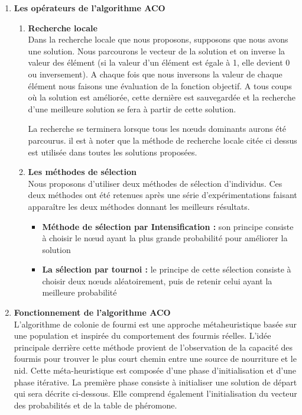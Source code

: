\begin{enumerate}
	\item \textbf{Les opérateurs de l’algorithme ACO}\\
\begin{enumerate}[label=\alph*)]
	\item \textbf{Recherche locale}\\
	Dans la recherche locale que nous proposons, supposons que nous avons une solution. Nous parcourons le vecteur de la solution et on inverse la valeur des élément (si la valeur d’un élément est égale à 1, elle devient 0 ou inversement). A chaque fois que nous inversons  la valeur  de chaque élément nous faisons une évaluation de la fonction objectif. A tous coups où la solution est améliorée, cette dernière est sauvegardée et la recherche d’une meilleure solution se fera à partir de cette solution.
	
La recherche se terminera lorsque tous  les nœuds dominants aurons été parcourus.
il est à noter que la méthode de recherche locale citée ci dessus est utilisée dans toutes les solutions proposées.
	
	\item \textbf{Les méthodes de sélection}\\
	Nous proposons d'utiliser deux méthodes de sélection d’individus. Ces deux méthodes ont été retenues après une série d'expérimentations faisant apparaître les deux méthodes donnant les meilleurs résultats.

	\begin{itemize}
		\item \textbf{Méthode de sélection par Intensification :}
		son principe consiste à choisir le nœud ayant la plus grande probabilité pour améliorer la solution 
		
		\item \textbf{La sélection par tournoi :}
		le principe de cette sélection consiste à choisir deux nœuds aléatoirement, puis de retenir celui ayant la meilleure probabilité 
	\end{itemize}
\end{enumerate}
	


	\item \textbf{Fonctionnement de l’algorithme ACO}\\
L’algorithme de colonie de fourmi est une approche métaheuristique basée sur une  population et inspirée du comportement des fourmis réelles. L’idée principale derrière cette méthode provient de l’observation de la capacité des fourmis pour trouver le plus court chemin entre une  source de nourriture et le nid.
Cette méta-heuristique est composée d’une phase d’initialisation et d’une phase itérative. La première phase consiste à initialiser une solution de départ qui sera décrite ci-dessous. Elle comprend également l’initialisation du vecteur des probabilités et de la table de phéromone.


\end{enumerate}
